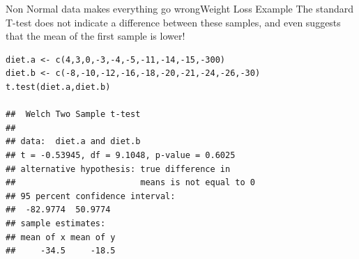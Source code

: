 \begin{frame}[fragile]{Non Normal data makes everything go wrong}{Weight Loss Example}
The standard T-test does not indicate a difference between these samples,
and even suggests that the mean of the first sample is lower!\bigskip

{\smaller
\begin{verbatim}
diet.a <- c(4,3,0,-3,-4,-5,-11,-14,-15,-300)
diet.b <- c(-8,-10,-12,-16,-18,-20,-21,-24,-26,-30)
t.test(diet.a,diet.b)

##  Welch Two Sample t-test
##
## data:  diet.a and diet.b
## t = -0.53945, df = 9.1048, p-value = 0.6025
## alternative hypothesis: true difference in
##                         means is not equal to 0
## 95 percent confidence interval:
##  -82.9774  50.9774
## sample estimates:
## mean of x mean of y
##     -34.5     -18.5
\end{verbatim}}
\end{frame}



